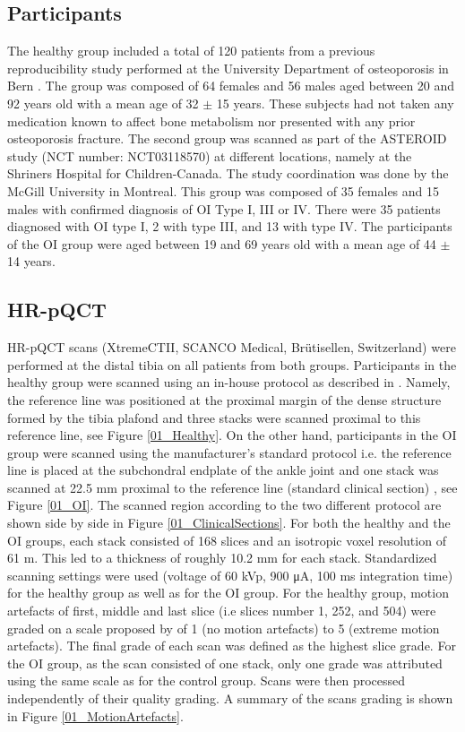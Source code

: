 \documentclass[a4paper,fleqn]{DC_ArtStyle}
\begin{document}
\subsection{Participants}
The healthy group included a total of 120 patients from a previous reproducibility study performed at the University Department of osteoporosis in Bern \cite{Schenk2020}. The group was composed of 64 females and 56 males aged between 20 and 92 years old with a mean age of 32 $\pm$ 15 years. These subjects had not taken any medication known to affect bone metabolism nor presented with any prior osteoporosis fracture. The second group was scanned as part of the ASTEROID study (NCT number: NCT03118570) at different locations, namely at the Shriners Hospital for Children-Canada. The study coordination was done by the McGill University in Montreal. This group was composed of 35 females and 15 males with confirmed diagnosis of OI Type I, III or IV. There were 35 patients diagnosed with OI type I, 2 with type III, and 13 with type IV. The participants of the OI group were aged between 19 and 69 years old with a mean age of 44 $\pm$ 14 years. 

\subsection{HR-pQCT}
HR-pQCT scans (XtremeCTII, SCANCO Medical, Brütisellen,
Switzerland) were performed at the distal tibia on all patients from both groups. Participants in the healthy group were scanned using an in-house protocol as described in \cite{Schenk2020}. Namely, the reference line was positioned at the proximal margin of the dense structure formed by the tibia plafond and three stacks were scanned proximal to this reference line, see Figure \ref{01_Healthy}. On the other hand, participants in the OI group were scanned using the manufacturer's standard protocol i.e. the reference line is placed at the subchondral endplate of the ankle joint and one stack was scanned at 22.5 mm proximal to the reference line (standard clinical section) \cite{Whittier2020}, see Figure \ref{01_OI}. The scanned region according to the two different protocol are shown side by side in Figure \ref{01_ClinicalSections}. For both the healthy and the OI groups, each stack consisted of 168 slices and an isotropic voxel resolution of 61 \si{\micro}m. This led to a thickness of roughly 10.2 mm for each stack. Standardized scanning settings were used (voltage of 60 kVp, 900 μA, 100 ms integration time) for the healthy group as well as for the OI group. For the healthy group, motion artefacts of first, middle and last slice (i.e slices number 1, 252, and 504) were graded on a scale proposed by \citeauthor{Pialat2012} \cite{Pialat2012} of 1 (no motion artefacts) to 5 (extreme motion artefacts). The final grade of each scan was defined as the highest slice grade. For the OI group, as the scan consisted of one stack, only one grade was attributed using the same scale as for the control group. Scans were then processed independently of their quality grading. A summary of the scans grading is shown in Figure \ref{01_MotionArtefacts}.
\end{document}
